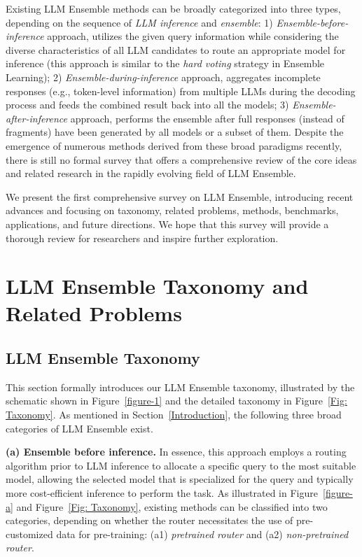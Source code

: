 \documentclass{article}
\begin{document}
Existing LLM Ensemble methods can be broadly categorized into three types, depending on the sequence of \textit{LLM inference} and \textit{ensemble}:
1) 
\textit{Ensemble-before-inference} approach, utilizes the given query information while considering the diverse characteristics of all LLM candidates to route an appropriate model for inference (this approach is similar to the \textit{hard voting}  strategy in Ensemble Learning);
2)
\textit{Ensemble-during-inference} approach, aggregates incomplete responses (e.g., token-level information) from multiple LLMs during the decoding process and feeds the combined result back into all the models;
3)
\textit{Ensemble-after-inference} approach, performs the ensemble after full responses (instead of fragments) have been generated by all models or a subset of them.
Despite the emergence of numerous methods derived from these broad paradigms recently, there is still no formal survey that offers a comprehensive review of the core ideas and related research in the rapidly evolving field of LLM Ensemble.

\newpage

We present the first comprehensive survey on LLM Ensemble, introducing recent advances and focusing on taxonomy, related problems, methods, benchmarks, applications, and future directions. 
We hope that this survey will provide a thorough review for researchers and inspire further exploration.










\section{LLM Ensemble Taxonomy and Related Problems}

\subsection{LLM Ensemble Taxonomy}
\label{Taxonomy-section}


This section formally introduces our LLM Ensemble taxonomy, illustrated by the schematic shown in Figure~\ref{figure-1} and the detailed taxonomy in Figure~\ref{Fig: Taxonomy}.
As mentioned in Section~\ref{Introduction}, the following three broad categories of LLM Ensemble exist.



\textbf{(a) Ensemble before inference.}
In essence, this approach employs a routing algorithm prior to LLM inference to allocate a specific query to the most suitable model, allowing the selected model that is specialized for the query and typically more cost-efficient inference to perform the task.
As illustrated in Figure~\ref{figure-a} and Figure~\ref{Fig: Taxonomy}, existing methods can be classified into two categories, depending on whether the router necessitates the use of pre-customized data for pre-training: 
(a1) \textit{pretrained router} and (a2) \textit{non-pretrained router}.
\end{document}

